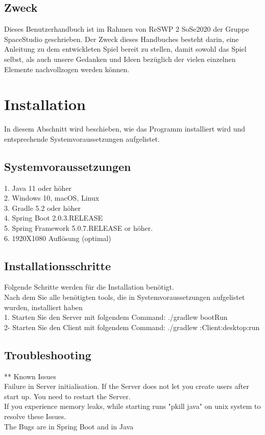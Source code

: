 \documentclass[fontsize=12pt,paper=a4,twoside]{scrartcl}
\begin{document}
\subsection{Zweck}

Dieses Benutzerhandbuch ist im Rahmen von ReSWP 2 SoSe2020  der Gruppe SpaceStudio geschrieben.
Der Zweck dieses Handbuches besteht darin, eine Anleitung zu dem entwickleten Spiel bereit zu stellen, damit sowohl das Spiel selbst, als auch unsere Gedanken und Ideen bezüglich der vielen einzelnen Elemente nachvollzogen werden können.


\section{Installation}
In diesem Abschnitt wird beschieben, wie das Programm installiert wird und entsprechende Systemvoraussetzungen aufgelistet.

\subsection{Systemvoraussetzungen}
1. Java 11 oder höher \\
2. Windows 10, macOS, Linux \\
3. Gradle 5.2 oder höher \\
4. Spring Boot 2.0.3.RELEASE \\
5.  Spring Framework 5.0.7.RELEASE or höher. \\
6. 1920X1080 Auflösung (optimal)
 

\subsection{Installationsschritte}
Folgende  Schritte werden für die Installation benötigt. \\
 Nach dem Sie alle benötigten tools, die in Systemvoraussetzungen aufgelistet wurden, installiert haben \\
1. Starten Sie den Server mit folgendem Command: ./gradlew bootRun\\
2- Starten Sie den Client mit folgendem Command:  ./gradlew :Client:desktop:run \\

\subsection{Troubleshooting}
** Known Issues\\
Failure in Server initialisation. If the Server does not let you create users after start up. You need to restart the Server.\\
If you experience memory leaks, while starting runs "pkill java" on unix system to resolve these Issues.\\
The Bugs are in Spring Boot and in Java\\
\end{document}
